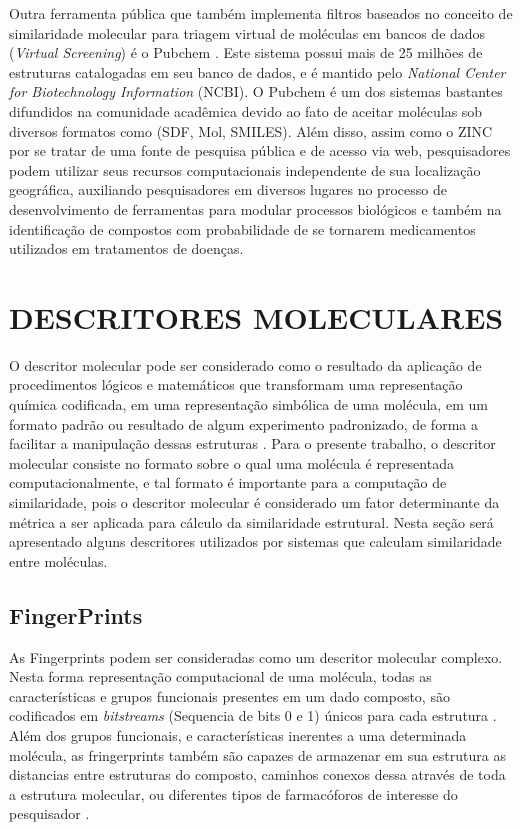 Outra ferramenta pública que também implementa filtros baseados no conceito de similaridade molecular para triagem virtual de moléculas em bancos de dados (\textit{Virtual Screening})   é o Pubchem \cite{li2010pubchem}. Este sistema possui mais de 25 milhões de estruturas catalogadas em seu banco de dados, e é mantido pelo \textit{National Center for Biotechnology Information} (NCBI). O Pubchem é um dos sistemas bastantes difundidos na comunidade acadêmica devido ao fato de aceitar moléculas sob diversos formatos como (SDF, Mol, SMILES). Além disso, assim como o ZINC \cite{irwin2005zinc} por se tratar de uma fonte de pesquisa pública e de acesso via web, pesquisadores podem utilizar seus recursos computacionais independente de sua localização geográfica, auxiliando pesquisadores em diversos lugares no processo de desenvolvimento de ferramentas para modular processos biológicos e também na identificação de compostos com probabilidade de se tornarem medicamentos utilizados em tratamentos de doenças.   

\section{DESCRITORES MOLECULARES}
O descritor molecular pode ser considerado como o resultado da aplicação de procedimentos lógicos e matemáticos que transformam uma representação química codificada, em uma representação simbólica de uma molécula, em um formato padrão ou resultado de algum experimento padronizado, de forma a facilitar a manipulação dessas estruturas \cite{todeschini2008handbook}. Para o presente trabalho, o descritor molecular consiste no formato sobre o qual uma molécula é representada computacionalmente, e tal formato é importante para a computação de
similaridade, pois o descritor molecular é considerado um fator determinante da métrica a ser
aplicada para cálculo da similaridade estrutural. Nesta seção será apresentado alguns
descritores utilizados por sistemas que calculam similaridade entre moléculas.

\subsection{FingerPrints}
As Fingerprints podem ser consideradas como um descritor molecular complexo. Nesta forma representação computacional de uma molécula, todas as características e grupos funcionais presentes em um dado composto, são codificados em \textit{bitstreams} (Sequencia de bits 0 e 1) únicos para cada estrutura \cite{xue2000molecular}. Além dos grupos funcionais, e características inerentes a uma determinada molécula, as fringerprints também são capazes de armazenar em sua estrutura as distancias entre estruturas do composto, caminhos conexos dessa através de toda a estrutura molecular, ou diferentes tipos de farmacóforos de interesse do pesquisador \cite{todeschini2008handbook}.

